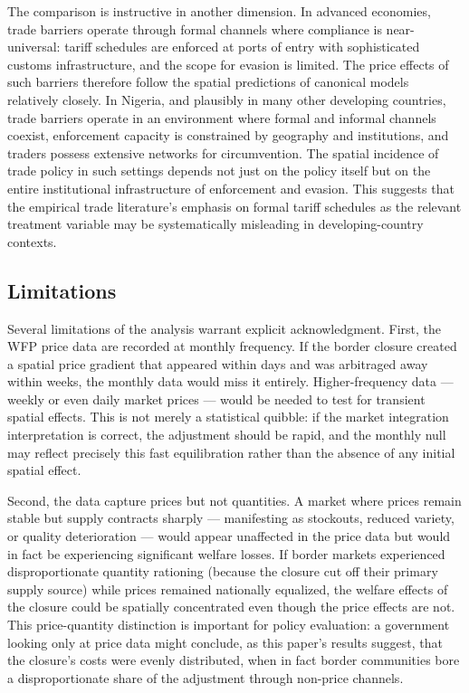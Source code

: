 \documentclass[12pt]{article}
\begin{document}
The comparison is instructive in another dimension. In advanced economies, trade barriers operate through formal channels where compliance is near-universal: tariff schedules are enforced at ports of entry with sophisticated customs infrastructure, and the scope for evasion is limited. The price effects of such barriers therefore follow the spatial predictions of canonical models relatively closely. In Nigeria, and plausibly in many other developing countries, trade barriers operate in an environment where formal and informal channels coexist, enforcement capacity is constrained by geography and institutions, and traders possess extensive networks for circumvention. The spatial incidence of trade policy in such settings depends not just on the policy itself but on the entire institutional infrastructure of enforcement and evasion. This suggests that the empirical trade literature's emphasis on formal tariff schedules as the relevant treatment variable may be systematically misleading in developing-country contexts.

\subsection{Limitations}

Several limitations of the analysis warrant explicit acknowledgment. First, the WFP price data are recorded at monthly frequency. If the border closure created a spatial price gradient that appeared within days and was arbitraged away within weeks, the monthly data would miss it entirely. Higher-frequency data --- weekly or even daily market prices --- would be needed to test for transient spatial effects. This is not merely a statistical quibble: if the market integration interpretation is correct, the adjustment should be rapid, and the monthly null may reflect precisely this fast equilibration rather than the absence of any initial spatial effect.

Second, the data capture prices but not quantities. A market where prices remain stable but supply contracts sharply --- manifesting as stockouts, reduced variety, or quality deterioration --- would appear unaffected in the price data but would in fact be experiencing significant welfare losses. If border markets experienced disproportionate quantity rationing (because the closure cut off their primary supply source) while prices remained nationally equalized, the welfare effects of the closure could be spatially concentrated even though the price effects are not. This price-quantity distinction is important for policy evaluation: a government looking only at price data might conclude, as this paper's results suggest, that the closure's costs were evenly distributed, when in fact border communities bore a disproportionate share of the adjustment through non-price channels.
\end{document}
